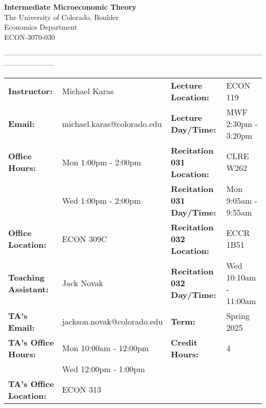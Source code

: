 \documentclass[11pt]{article}
\begin{document}
\begin{center}
\textbf{\Large Intermediate Microeconomic Theory}\\
The University of Colorado, Boulder\\ Economics Department\\ ECON-3070-030
\end{center}

---------------------------------------------------------------------------------------------------------------------------------
\vspace{-.1in}
\begin{center}
\begin{tabular}{llll}
    \textbf{Instructor:} & \footnotesize{Michael Karas}  &   \textbf{Lecture Location:}  & \footnotesize{ECON 119}\\ 
    \textbf{Email:} & \footnotesize{michael.karas@colorado.edu} &   \textbf{Lecture Day/Time:} & \footnotesize{MWF 2:30pm - 3:20pm}\\
    \textbf{Office Hours:} & \footnotesize{Mon 1:00pm - 2:00pm}   &  \textbf{Recitation 031 Location:} & \footnotesize{CLRE W262} \\
    \textbf{} & \footnotesize{Wed 1:00pm - 2:00pm}   &  \textbf{Recitation 031 Day/Time:} & \footnotesize{Mon 9:05am - 9:55am} \\
    \textbf{Office Location:} & \footnotesize{ECON 309C}  & \textbf{Recitation 032 Location:} & \footnotesize{ECCR 1B51}\\
    \textbf{Teaching Assistant:} & \footnotesize{Jack Novak}   & \textbf{Recitation 032 Day/Time:} & \footnotesize{Wed 10:10am - 11:00am}\\
    \textbf{TA's Email:} & \footnotesize{jackson.novak@colorado.edu}   & \textbf{Term:} & \footnotesize{Spring 2025}\\
    \textbf{TA's Office Hours:} & \footnotesize{Mon 10:00am - 12:00pm}   & \textbf{Credit Hours:} & \footnotesize{4}\\
    \textbf{} & \footnotesize{Wed 12:00pm - 1:00pm}   &  \textbf{} & \footnotesize{} \\
        \textbf{TA's Office Location:} & \footnotesize{ECON 313}   & \textbf{} & \\
\end{tabular}
\end{center}
\end{document}
